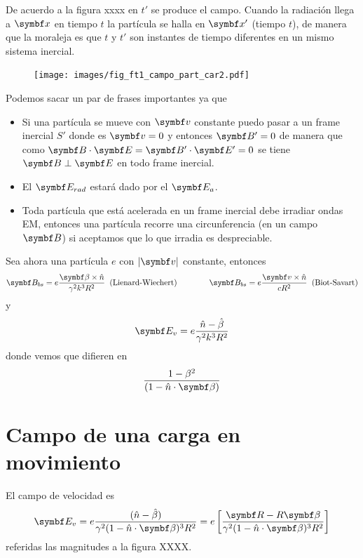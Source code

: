 \documentclass[10pt,oneside]{CBFT_book}
\begin{document}
De acuerdo a la figura xxxx en $t'$ se produce el campo. Cuando la radiación llega a $\vb{x}$ en tiempo $t$ 
la partícula se halla en $\vb{x}'$ (tiempo $t$), de manera que la moraleja es que $t$ y $t'$ son instantes
de tiempo diferentes en un mismo sistema inercial.

\begin{figure}[htb]
	\begin{center}
	\texttt{[image: images/fig\_ft1\_campo\_part\_car2.pdf]}	 
	\end{center}
	\caption{}
\end{figure} 

Podemos sacar un par de frases importantes ya que 
\begin{itemize}
 \item Si una partícula se mueve con $\vb{v}$ constante puedo pasar a un frame inercial $S'$ donde es 
 $\vb{v}=0$ y entonces $\vb{B}'=0$ de manera que como $\pe{B}{E}=\pe{B'}{E'}=0$ se tiene $\vb{B}\perp\vb{E}$
 en todo frame inercial.
 \item El $\vb{E}_{rad}$ estará dado por el $\vb{E}_a$.
 \item Toda partícula que está acelerada en un frame inercial debe irradiar ondas EM, entonces una partícula
 recorre una circunferencia (en un campo $\vb{B}$) si aceptamos que lo que irradia es despreciable.
\end{itemize}

Sea ahora una partícula $e$ con $|\vb{v}|$ constante, entonces 
\[
	\vb{B}_{bs} = e\frac{\vb{\beta}\times\hat{n}}{\gamma^2k^3R^2} \;\; \text{(Lienard-Wiechert)}
	\qquad \qquad 
	\vb{B}_{bs} = e\frac{\vb{v}\times\hat{n}}{cR^2} \;\; \text{(Biot-Savart)}
\]
y 
\[
	\vb{E}_{v} = e\frac{ \hat{n}- \hat{\beta} }{\gamma^2k^3R^2}
\]
donde vemos que difieren en 
\[
	\frac{1-\beta^2}{(1-\hat{n}\cdot{\vb{\beta}})}
\]


\section{Campo de una carga en movimiento}

El campo de velocidad es 
\[
	\vb{E}_v = e \frac{(\hat{n}-\hat{\beta})}{\gamma^2(1-\hat{n}\cdot\vb{\beta})^3R^2} =
		e \left[ \frac{\vb{R}-R\vb{\beta}}{\gamma^2(1-\hat{n}\cdot\vb{\beta})^3R^2} \right]
\]
referidas las magnitudes a la figura XXXX.
\end{document}
